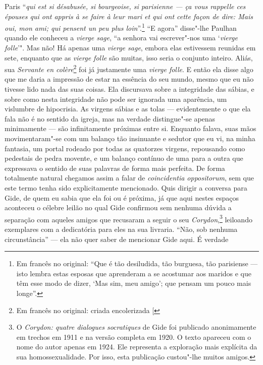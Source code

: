 Paris ``\emph{qui est si désabusée, si bourgeoise, si parisienne --- ça
vous rappelle ces épouses qui ont appris à se faire à leur mari et qui
ont cette façon de dire: Mais oui, mon ami; qui pensent un peu plus
loin}''.\footnote{Em francês no original: ``Que é tão desiludida, tão burguesa, tão
  parisiense --- isto lembra estas esposas que aprenderam a se acostumar
  aos maridos e que têm esse modo de dizer, `Mas sim, meu amigo'; que
  pensam um pouco mais longe''. \versal{[N. T.]}} ``E agora''
disse"-lhe Paulhan quando ele conheceu a \emph{vierge sage}, ``a senhora
vai escrever"-nos uma `\emph{vierge folle}'". Mas não! Há apenas uma
\emph{vierge sage}, embora elas estivessem reunidas em sete, enquanto
que as \emph{vierge folle} são muitas, isso seria o conjunto inteiro.
Aliás, sua \emph{Servante en colère}\footnote{Em francês no original: criada encolerizada {[}\versal{N. T.}{]}} foi já justamente uma \emph{vierge
folle}. E então ela disse algo que me daria a impressão de estar na
essência do seu mundo, mesmo que eu não tivesse lido nada das suas
coisas. Ela discursava sobre a integridade das sábias, e sobre como
nesta integridade não pode ser ignorada uma aparência, um vislumbre de
hipocrisia. As virgens sábias e as tolas --- evidentemente o que ela fala
não é no sentido da igreja, mas na verdade distingue"-se apenas
minimamente --- são infinitamente próximas entre si. Enquanto falava,
suas mãos movimentaram"-se com um balanço tão insinuante e sedutor que eu
vi, na minha fantasia, um portal rodeado por todas as quatorzes virgens,
repousando como pedestais de pedra movente, e um balanço contínuo de uma
para a outra que expressava o sentido de suas palavras de forma mais
perfeita. De forma totalmente natural chegamos assim a falar de
\emph{coincidentia oppositorum}, sem que este termo tenha sido
explicitamente mencionado. Quis dirigir a conversa para Gide, de quem eu
sabia que ela foi ou é próxima, já que aqui nestes espaços aconteceu o
célebre leilão no qual Gide confirmou sem nenhuma dúvida a separação com
aqueles amigos que recusaram a seguir o seu \emph{Corydon},\footnote{O \emph{Corydon: quatre dialogues socratiques} de Gide foi publicado
  anonimamente em trechos em 1911 e na versão completa em 1920. O texto
  apareceu com o nome do autor apenas em 1924. Ele representa a
  exploração mais explícita da sua homossexualidade. Por isso, esta
  publicação custou"-lhe muitos amigos. \versal{[N. E.]}} leiloando exemplares com a
dedicatória para eles na sua livraria. ``Não, sob nenhuma
circunstância'' --- ela não quer saber de mencionar Gide aqui. É verdade
